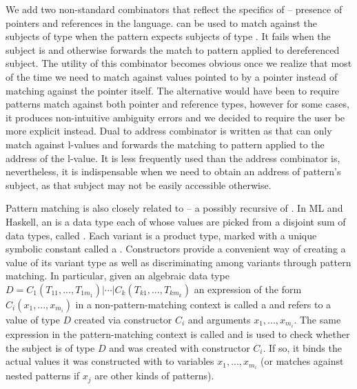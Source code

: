 We add two non-standard combinators that reflect the specifics of \Cpp{} -- 
presence of pointers and references in the language.  
 can be used to match against the subjects of type  when the 
pattern  expects subjects of type . It fails when the subject 
is  and otherwise forwards the match to pattern  applied 
to dereferenced subject. The utility of this combinator becomes obvious once we 
realize that most of the time we need to match against values pointed to by a 
pointer instead of matching against the pointer itself. The alternative would 
have been to require patterns match against both pointer and reference types, 
however for some cases, it produces non-intuitive ambiguity errors and we decided 
to require the user be more explicit instead. Dual to address combinator 
is  written as  that can only match 
against l-values and forwards the matching to pattern  applied to the 
address of the l-value. It is less frequently used than the address combinator is, 
nevertheless, it is indispensable when we need to obtain an address of pattern's 
subject, as that subject may not be easily accessible otherwise.


Pattern matching is also closely related to  -- a 
possibly recursive  of . In ML and Haskell, an 
 is a data type each of whose values are picked from a 
disjoint sum of data types, called . Each variant is a product 
type, marked with a unique symbolic constant called a . 
Constructors provide a convenient way of creating a value of its variant type as 
well as discriminating among variants through pattern matching. In particular,
given an algebraic data type $D = C_1(T_{11},...,T_{1m_1}) | \cdots | C_k(T_{k1},...,T_{km_k})$
an expression of the form $C_i(x_1,...,x_{m_i})$ in a non-pattern-matching 
context is called a  and refers to a value of type $D$ 
created via constructor $C_i$ and arguments $x_1,...,x_{m_i}$. The same 
expression in the pattern-matching context is called  
and is used to check whether the subject is of type $D$ and was created with 
constructor $C_i$. If so, it binds the actual values it was constructed with to  
variables $x_1,...,x_{m_i}$ (or matches against nested patterns if $x_j$ are 
other kinds of patterns).

